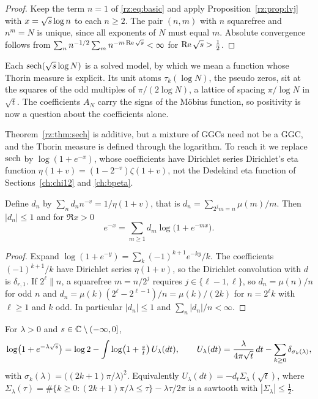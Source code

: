 \begin{proof}
Keep the term $n=1$ of \eqref{rz:eq:basic} and apply Proposition~\ref{rz:prop:lvj} with $x=\sqrt{s}\log n$ to each $n\ge2$. The pair $(n,m)$ with $n$ squarefree and $n^m=N$ is unique, since all exponents of $N$ must equal $m$. Absolute convergence follows from $\sum_n n^{-1/2}\sum_m n^{-m\operatorname{Re}\sqrt{s}}<\infty$ for $\operatorname{Re}\sqrt{s}>\frac12$.
\end{proof}

Each $\operatorname{sech}(\sqrt{s}\log N)$ is a solved model, by which we mean a function whose Thorin measure is explicit. Its unit atoms $\tau_k(\log N)$, the pseudo zeros, sit at the squares of the odd multiples of $\pi/(2\log N)$, a lattice of spacing $\pi/\log N$ in $\sqrt t$. The coefficients $A_N$ carry the signs of the M\"obius function, so positivity is now a question about the coefficients alone.

Theorem~\ref{rz:thm:sech} is additive, but a mixture of GGCs need not be a GGC, and the Thorin measure is defined through the logarithm. To reach it we replace $\operatorname{sech}$ by $\log(1+e^{-x})$, whose coefficients have Dirichlet series Dirichlet's eta function $\eta(1+v)=(1-2^{-v})\zeta(1+v)$, not the Dedekind eta function of Sections~\ref{ch:chi12} and \ref{ch:bpeta}.

\begin{proposition}\label{rz:prop:eta}
Define $d_n$ by $\sum_n d_n n^{-v}=1/\eta(1+v)$, that is $d_n=\sum_{2^jm=n}\mu(m)/m$. Then $|d_n|\le1$ and for $\Re x>0$
\[
e^{-x}=\sum_{m\ge1}d_m\log\bigl(1+e^{-mx}\bigr).
\]
\end{proposition}

\begin{proof}
Expand $\log(1+e^{-y})=\sum_k(-1)^{k+1}e^{-ky}/k$. The coefficients $(-1)^{k+1}/k$ have Dirichlet series $\eta(1+v)$, so the Dirichlet convolution with $d$ is $\delta_{r,1}$. If $2^\ell\| n$, a squarefree $m=n/2^j$ requires $j\in\{\ell-1,\ell\}$, so $d_n=\mu(n)/n$ for odd $n$ and $d_n=\mu(k)(2^\ell-2^{\ell-1})/n=\mu(k)/(2k)$ for $n=2^\ell k$ with $\ell\ge1$ and $k$ odd. In particular $|d_n|\le1$ and $\sum_n|d_n|/n<\infty$.
\end{proof}

\begin{lemma}\label{rz:lem:saw}
For $\lambda>0$ and $s\in\mathbb{C}\setminus(-\infty,0]$,
\[
\log\bigl(1+e^{-\lambda\sqrt{s}}\bigr)=\log2-\int\log\bigl(1+\tfrac st\bigr)\,U_\lambda(dt),
\qquad
U_\lambda(dt)=\frac{\lambda}{4\pi\sqrt t}\,dt-\sum_{k\ge0}\delta_{\sigma_k(\lambda)},
\]
with $\sigma_k(\lambda)=\bigl((2k+1)\pi/\lambda\bigr)^2$. Equivalently $U_\lambda(dt)=-d_t\Sigma_\lambda(\sqrt t)$, where $\Sigma_\lambda(\tau)=\#\{k\ge0:(2k+1)\pi/\lambda\le\tau\}-\lambda\tau/2\pi$ is a sawtooth with $|\Sigma_\lambda|\le\frac12$.
\end{lemma}

